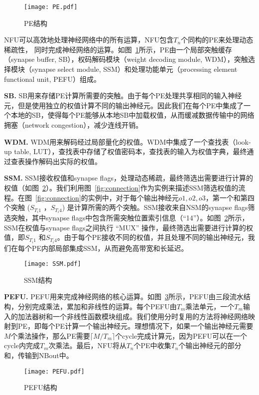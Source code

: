 \begin{figure}[h]
\centering
\texttt{[image: PE.pdf]}
\caption{PE结构}
\label{fig:PE}
\end{figure}

NFU可以高效地处理神经网络中的所有运算，NFU包含$T_n$个同构的PE来处理动态稀疏性， 同时完成神经网络的运算。如图~\ref{fig:PE}所示，PE由一个局部突触缓存（synapse buffer, SB），权码解码模块（weight decoding module, WDM），突触选择模块（synapse select module, SSM）和处理功能单元（processing element functional unit, PEFU）组成。

\textbf{SB.} SB用来存储PE计算所需要的突触。由于每个PE处理共享相同的输入神经元，但是使用独立的权值计算不同的输出神经元。因此我们在每个PE中集成了一个本地的SB，使得每个PE能够从本地SB中加载权值，从而缓减数据传输中的网络拥塞（network congestion），减少连线开销。

\textbf{WDM.} WDM用来解码经过局部量化的权值。WDM中集成了一个查找表（look-up table, LUT），查找表中存储了权值密码本，查找表的输入为权值字典，最终通过查表操作解码出实际的权值。

\textbf{SSM.} SSM接收权值和synapse flags，处理动态稀疏，最终筛选出需要进行计算的权值（如图~\ref{fig:SSM}）。我们利用图~\ref{fig:connection}作为实例来描述SSM筛选权值的流程。在图~\ref{fig:connection}的实例中，对于每个输出神经元$o1, o2, o3$，第一个和第四个突触 ($S_{T_{i}1}$ ，$S_{T_{i}4}$) 是计算所需的两个突触。SSM接收来自NSM的synapse flags筛选突触，其中synapse flags中包含所需突触位置索引信息（“14”）。如图~\ref{fig:SSM}所示，SSM在权值与synapse flags之间执行 “MUX” 操作，最终筛选出需要进行计算的权值，即$S_{T_{i}1}$ 和$S_{T_{i}4}$。由于每个PE接收不同的权值，并且处理不同的输出神经元，我们在每个PE内部局部集成SSM，从而避免高带宽和长延迟。

\begin{figure}[h]
\centering
\texttt{[image: SSM.pdf]}
\caption{SSM结构}
\label{fig:SSM}
\end{figure}

\textbf{PEFU.} PEFU用来完成神经网络的核心运算。如图~\ref{fig:PEFU}所示，PEFU由三段流水结构，分别完成乘法，累加和非线性的运算。每个PEFU由$T_m$乘法单元，一个$T_m$输入的加法器树和一个非线性函数模块组成。我们使用分时复用的方法将神经网络映射到PE，即每个PE计算一个输出神经元。理想情况下，如果一个输出神经元需要$M$个乘法操作，那么PE需要$\lceil M/T_{m} \rceil$个cycle完成计算元，因为PEFU可以在一个cycle内完成$T_m$次乘法。最后，NFU将从$T_n$个PE中收集$T_n$个输出神经元的部分和，传输到NBout中。 

\begin{figure}[h]
\centering
\texttt{[image: PEFU.pdf]}
\caption{PEFU结构}
\label{fig:PEFU}
\end{figure}

